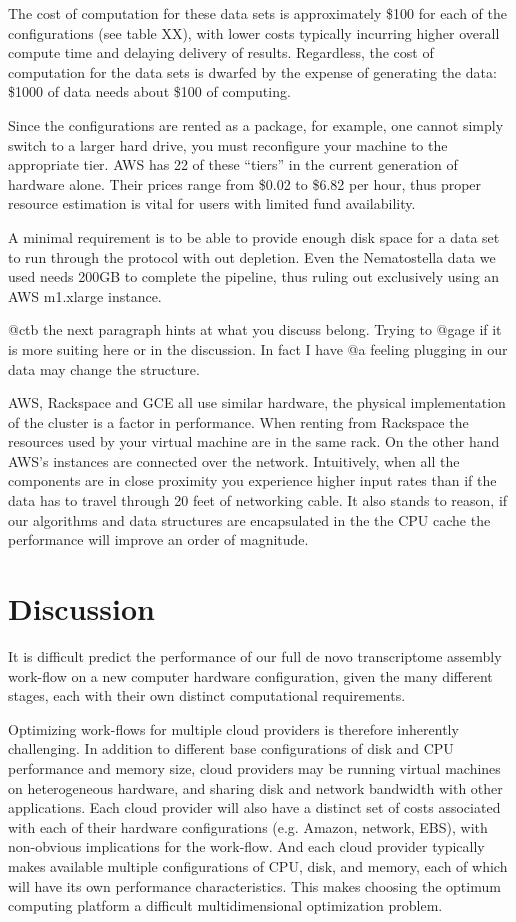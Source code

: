 The cost of computation for these data sets is approximately \$100 for
each of the configurations (see table XX), with lower costs typically
incurring higher overall compute time and delaying delivery of
results. Regardless, the cost of computation for the data sets is
dwarfed by the expense of generating the data: \$1000 of data needs
about \$100 of computing.

Since the configurations are rented as a package, for example, one
cannot simply switch to a larger hard drive, you must reconfigure your
machine to the appropriate tier. AWS has 22 of these ``tiers'' in the
current generation of hardware alone. Their prices range from \$0.02
to \$6.82 per hour, thus proper resource estimation is vital for users
with limited fund availability.

A minimal requirement is to be able to provide enough disk space for a
data set to run through the protocol with out depletion. Even the
Nematostella data we used needs 200GB to complete the pipeline, thus
ruling out exclusively using an AWS m1.xlarge instance.


@ctb the next paragraph hints at what you discuss belong. Trying to
@gage if it is more suiting here or in the discussion. In fact I have
@a feeling plugging in our data may change the structure.

AWS, Rackspace and GCE all use similar hardware, the physical
implementation of the cluster is a factor in performance. When renting
from Rackspace the resources used by your virtual machine are in the
same rack. On the other hand AWS’s instances are connected over the
network. Intuitively, when all the components are in close proximity
you experience higher input rates than if the data has to travel
through 20 feet of networking cable. It also stands to reason, if our
algorithms and data structures are encapsulated  in the the CPU cache
the performance will improve an order of magnitude.

\section*{Discussion}

It is difficult predict the performance of our full de novo
transcriptome assembly work-flow on a new computer hardware
configuration, given the many different stages, each with their
own distinct computational requirements.

Optimizing work-flows for multiple cloud providers is therefore
inherently challenging.  In addition to different base configurations
of disk and CPU performance and memory size, cloud providers may be
running virtual machines on heterogeneous hardware, and sharing disk
and network bandwidth with other applications.  Each cloud provider
will also have a distinct set of costs associated with each of their
hardware configurations (e.g. Amazon, network, EBS), with non-obvious
implications for the work-flow.  And each cloud provider typically
makes available multiple configurations of CPU, disk, and memory, each
of which will have its own performance characteristics.  This makes
choosing the optimum computing platform a difficult multidimensional
optimization problem.

